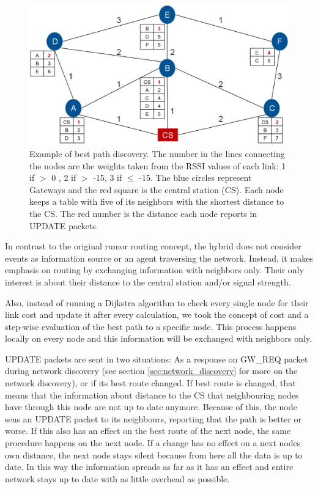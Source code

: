 \begin{figure}
    \centering
    \includegraphics[width=15cm]{images/Example_Routing.png}
	\vspace{-1.5em}
    \caption[Best path discovery example]{Example of best path discovery. 
	The number in the lines connecting the nodes are the weights taken from the RSSI values of each link: 1 if \(>\) 0 , 2 if \(>\) -15, 3 if \(\leq\) -15.
	The blue circles represent Gateways and the red square is the central station (CS).
	Each node keeps a table with five of its neighbors with the shortest distance to the CS.
	The red number is the distance each node reports in UPDATE packets.}
    \vspace{-1.5em}
    \label{fig:routing}
\end{figure}

In contrast to the original rumor routing concept, the hybrid does not consider events as information source or an agent traversing the network. 
Instead, it makes emphasis on routing by exchanging information with neighbors only. 
Their only interest is about their distance to the central station and/or signal strength.

Also, instead of running a Dijkstra algorithm to check every single node for their link cost and update it after every calculation, we took the concept of cost and a step-wise evaluation of the best path to a specific node. 
This process happens locally on every node and this information will be exchanged with neighbors only. 

UPDATE packets are sent in two situations: As a response on GW_REQ packet during network discovery (see section \ref{sec:network_discovery} for more on the network discovery), or if its best route changed.
If best route is changed, that means that the information about distance to the CS that neighbouring nodes have through this node are not up to date anymore. Because of this, the node sens an UPDATE packet to its neighbours, reporting that the path is better or worse. If this also has an effect on the best route of the next node, the same procedure happens on the next node. If a change has no effect on a next nodes own distance, the next node stays silent because from here all the data is up to date. In this way the information spreads as far as it has an effect and entire network stays up to date with as little overhead as possible.